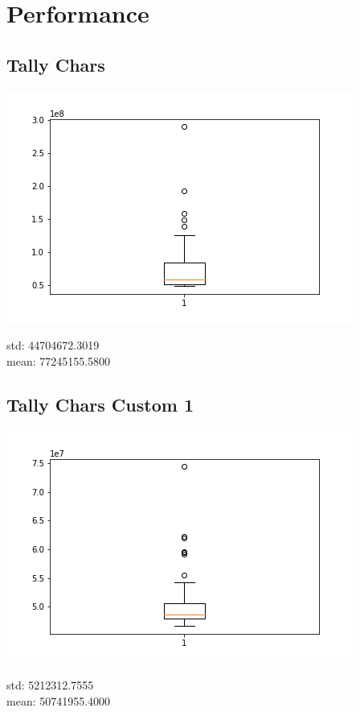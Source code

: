 \documentclass[a4paper,11pt]{article}
\theoremstyle{mytheor}
\begin{document}
\section*{Performance}

\subsection*{Tally Chars}
\includegraphics{assets/Tally_Chars.png} 

\noindent std: 44704672.3019 \\
mean: 77245155.5800

\subsection*{Tally Chars Custom 1}
\includegraphics{assets/Tally_Chars_Custom_1.png}

\noindent std: 5212312.7555 \\
mean: 50741955.4000
\end{document}
